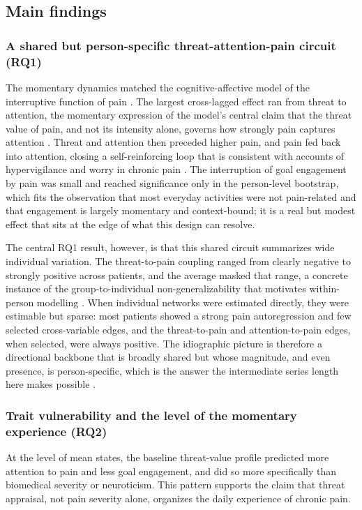 \documentclass[11pt,a4paper]{article}
\begin{document}
\subsection{Main findings}
\subsubsection{A shared but person-specific threat-attention-pain circuit (RQ1)}
The momentary dynamics matched the cognitive-affective model of the interruptive function of pain
\citep{eccleston1999pain}. The largest cross-lagged effect ran from threat to attention, the
momentary expression of the model's central claim that the threat value of pain, and not its
intensity alone, governs how strongly pain captures attention
\citep{crombez1998catastrophizing,crombez2013attention}. Threat and attention then preceded higher
pain, and pain fed back into attention, closing a self-reinforcing loop that is consistent with
accounts of hypervigilance and worry in chronic pain
\citep{eccleston2007worry,vandamme2010keeping,vlaeyen2000fear,crombez2012fear}. The interruption of goal
engagement by pain was small and reached significance only in the person-level bootstrap, which
fits the observation that most everyday activities were not pain-related
and that engagement is largely momentary and context-bound; it is a real but modest effect that
sits at the edge of what this design can resolve.

The central RQ1 result, however, is that this shared circuit summarizes wide individual variation.
The threat-to-pain coupling ranged from clearly negative to strongly positive across patients, and
the average masked that range, a concrete instance of the group-to-individual
non-generalizability that motivates within-person modelling
\citep{fisher2018lack,molenaar2004manifesto}. When individual networks were estimated directly,
they were estimable but sparse: most patients showed a strong pain autoregression and few selected
cross-variable edges, and the threat-to-pain and attention-to-pain edges, when selected, were
always positive. The idiographic picture is therefore a directional backbone that is broadly
shared but whose magnitude, and even presence, is person-specific, which is the answer the
intermediate series length here makes possible \citep{beltz2016bridging,wright2020personalized}.

\subsubsection{Trait vulnerability and the level of the momentary experience (RQ2)}
At the level of mean states, the baseline threat-value profile predicted more attention to pain
and less goal engagement, and did so more specifically than biomedical severity or neuroticism.
This pattern supports the claim that threat appraisal, not pain severity alone, organizes the
daily experience of chronic pain.
\end{document}
